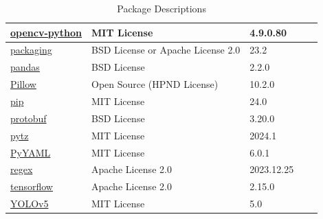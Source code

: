 \begin{table}[h!]
\begin{tabular}{|p{6cm}|p{3cm}|p{2.5cm}|@{}p{2.2cm}@{}|p{4cm}|}
		\hline
		\href{https://pypi.org/project/opencv-python/}{opencv-python} & MIT License & 4.9.0.80 \\
		\hline
		\href{https://pypi.org/project/packaging/}{packaging} & BSD License or Apache License 2.0 & 23.2 \\
		\hline
		\href{https://pypi.org/project/pandas/}{pandas} & BSD License & 2.2.0 \\
		\hline
		\href{https://pypi.org/project/Pillow/}{Pillow} & Open Source (HPND License) & 10.2.0 \\
		\hline
		\href{https://pypi.org/project/pip/}{pip} & MIT License & 24.0 \\
		\hline
		\href{https://pypi.org/project/protobuf/}{protobuf} & BSD License & 3.20.0 \\
		\hline
		\href{https://pypi.org/project/pytz/}{pytz} & MIT License & 2024.1 \\
		\hline
		\href{https://pypi.org/project/PyYAML/}{PyYAML} & MIT License & 6.0.1 \\
		\hline
		\href{https://pypi.org/project/regex/}{regex} & Apache License 2.0 & 2023.12.25 \\
		\hline	
		\href{https://pypi.org/project/tensorflow/}{tensorflow} & Apache License 2.0 & 2.15.0 \\
		\hline	
		\href{https://github.com/ultralytics/yolov5}{YOLOv5} & MIT License & 5.0 \\
		\hline
	\end{tabular}
	\caption{Package Descriptions}
	\label{tab:packages}
\end{table}